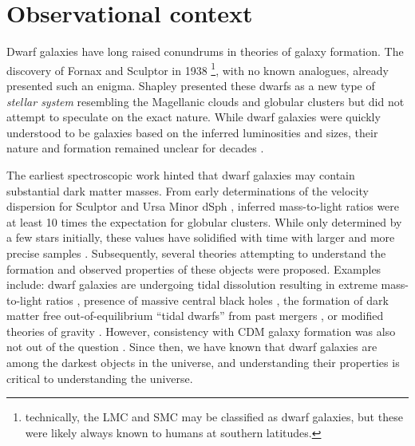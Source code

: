 \section{Observational context}\label{observational-context}

Dwarf galaxies have long raised conundrums in theories of galaxy
formation. The discovery of Fornax and Sculptor in 1938
\citep{shapley1938}\footnote{technically, the LMC and SMC may be
  classified as dwarf galaxies, but these were likely always known to
  humans at southern latitudes.}, with no known analogues, already
presented such an enigma. Shapley presented these dwarfs as a new type
of \emph{stellar system} resembling the Magellanic clouds and globular
clusters but did not attempt to speculate on the exact nature. While
dwarf galaxies were quickly understood to be galaxies based on the
inferred luminosities and sizes, their nature and formation remained
unclear for decades \citep[e.g.,][]{hodge1971, gallagher+wyse1994}.

The earliest spectroscopic work hinted that dwarf galaxies may contain
substantial dark matter masses. From early determinations of the
velocity dispersion for Sculptor and Ursa Minor dSph
\citep[e.g.,][\citet{aaronson+olszewski1987}]{aaronson1983}, inferred
mass-to-light ratios were at least 10 times the expectation for globular
clusters. While only determined by a few stars initially, these values
have solidified with time with larger and more precise samples
\citep[e.g.,][]{hargreaves+1994}. Subsequently, several theories
attempting to understand the formation and observed properties of these
objects were proposed. Examples include: dwarf galaxies are undergoing
tidal dissolution resulting in extreme mass-to-light ratios
\citep[e.g.,][]{kuhn+miller1989}, presence of massive central black
holes \citep[e.g.,][]{strobel+lake1994}, the formation of dark matter
free out-of-equilibrium ``tidal dwarfs'' from past mergers
\citep[e.g.,][\citet{kroupa1997}]{lynden-bell1982}, or modified theories
of gravity \citep{milgrom1995}. However, consistency with CDM galaxy
formation was also not out of the question
\citep[e.g.,][]{dekel+silk1986}. Since then, we have known that dwarf
galaxies are among the darkest objects in the universe, and
understanding their properties is critical to understanding the
universe.


